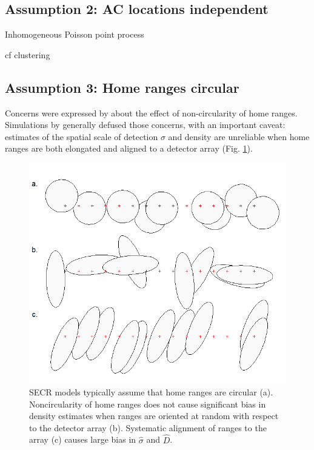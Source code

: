 \documentclass[
]{book}
\begin{document}
\subsection{Assumption 2: AC locations independent}\label{assumption-2-ac-locations-independent}

Inhomogeneous Poisson point process

cf clustering \citet{Bischof2020}

\subsection{Assumption 3: Home ranges circular}\label{assumption-3-home-ranges-circular}

Concerns were expressed by \citet{Ivan2013} about the effect of non-circularity of home ranges. Simulations by \citet{Efford2019} generally defused those concerns, with an important caveat: estimates of the spatial scale of detection \(\sigma\) and density are unreliable when home ranges are both elongated and aligned to a detector array (Fig. \ref{fig:alignment}).



\begin{figure}
\includegraphics[width=0.8\linewidth]{figures/alignment} \caption{SECR models typically assume that home ranges are circular (a). Noncircularity of home ranges does not cause significant bias in density estimates when ranges are oriented at random with respect to the detector array (b). Systematic alignment of ranges to the array (c) causes large bias in \(\hat \sigma\) and \(\hat D\).}\label{fig:alignment}
\end{figure}
\end{document}
